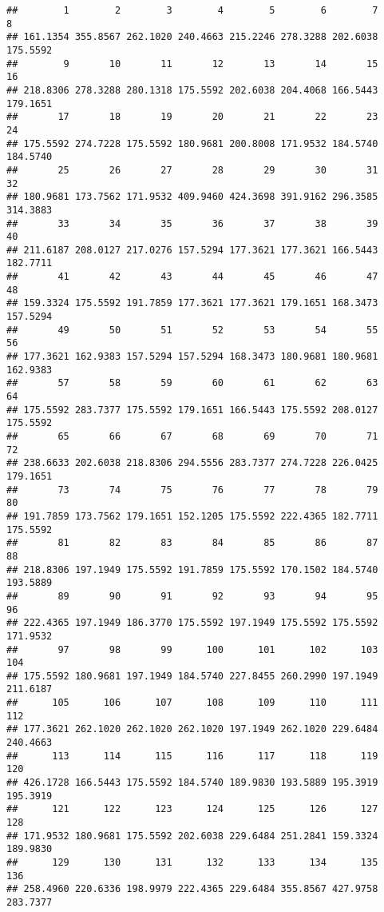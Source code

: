 \documentclass[
]{article}
\begin{document}
\begin{verbatim}
##        1        2        3        4        5        6        7        8 
## 161.1354 355.8567 262.1020 240.4663 215.2246 278.3288 202.6038 175.5592 
##        9       10       11       12       13       14       15       16 
## 218.8306 278.3288 280.1318 175.5592 202.6038 204.4068 166.5443 179.1651 
##       17       18       19       20       21       22       23       24 
## 175.5592 274.7228 175.5592 180.9681 200.8008 171.9532 184.5740 184.5740 
##       25       26       27       28       29       30       31       32 
## 180.9681 173.7562 171.9532 409.9460 424.3698 391.9162 296.3585 314.3883 
##       33       34       35       36       37       38       39       40 
## 211.6187 208.0127 217.0276 157.5294 177.3621 177.3621 166.5443 182.7711 
##       41       42       43       44       45       46       47       48 
## 159.3324 175.5592 191.7859 177.3621 177.3621 179.1651 168.3473 157.5294 
##       49       50       51       52       53       54       55       56 
## 177.3621 162.9383 157.5294 157.5294 168.3473 180.9681 180.9681 162.9383 
##       57       58       59       60       61       62       63       64 
## 175.5592 283.7377 175.5592 179.1651 166.5443 175.5592 208.0127 175.5592 
##       65       66       67       68       69       70       71       72 
## 238.6633 202.6038 218.8306 294.5556 283.7377 274.7228 226.0425 179.1651 
##       73       74       75       76       77       78       79       80 
## 191.7859 173.7562 179.1651 152.1205 175.5592 222.4365 182.7711 175.5592 
##       81       82       83       84       85       86       87       88 
## 218.8306 197.1949 175.5592 191.7859 175.5592 170.1502 184.5740 193.5889 
##       89       90       91       92       93       94       95       96 
## 222.4365 197.1949 186.3770 175.5592 197.1949 175.5592 175.5592 171.9532 
##       97       98       99      100      101      102      103      104 
## 175.5592 180.9681 197.1949 184.5740 227.8455 260.2990 197.1949 211.6187 
##      105      106      107      108      109      110      111      112 
## 177.3621 262.1020 262.1020 262.1020 197.1949 262.1020 229.6484 240.4663 
##      113      114      115      116      117      118      119      120 
## 426.1728 166.5443 175.5592 184.5740 189.9830 193.5889 195.3919 195.3919 
##      121      122      123      124      125      126      127      128 
## 171.9532 180.9681 175.5592 202.6038 229.6484 251.2841 159.3324 189.9830 
##      129      130      131      132      133      134      135      136 
## 258.4960 220.6336 198.9979 222.4365 229.6484 355.8567 427.9758 283.7377 

\end{verbatim}
\end{document}
